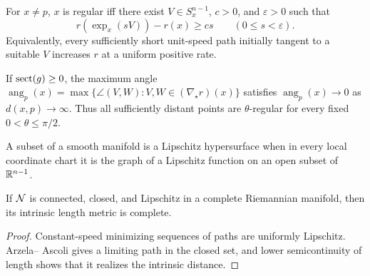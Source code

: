 \begin{lemma}
\label{lem:chow-iii-i34-i35-regular-characterization}
For $x\ne p$, $x$ is regular iff there exist $V\in S_x^{n-1}$, $c>0$, and
$\varepsilon>0$ such that
\[
r(\exp_x(sV))-r(x)\ge cs\qquad(0\le s<\varepsilon).
\]
Equivalently, every sufficiently short unit-speed path initially tangent to a
suitable $V$ increases $r$ at a uniform positive rate.
\end{lemma}

\begin{lemma}
\label{lem:chow-iii-i37-angle-decay}
If $\operatorname{sect}(g)\ge0$, the maximum angle
$\operatorname{ang}_p(x)=\max\{\angle(V,W):V,W\in(\nabla_\star r)(x)\}$
satisfies $\operatorname{ang}_p(x)\to0$ as $d(x,p)\to\infty$.  Thus all
sufficiently distant points are $\theta$-regular for every fixed
$0<\theta\le\pi/2$.
\end{lemma}

\begin{definition}
\label{def:chow-iii-i39-lipschitz-hypersurface}
A subset of a smooth manifold is a Lipschitz hypersurface when in every local
coordinate chart it is the graph of a Lipschitz function on an open subset of
$\mathbb R^{n-1}$.
\end{definition}

\begin{lemma}
\label{lem:chow-iii-i40-lipschitz-complete}
If $\mathcal N$ is connected, closed, and Lipschitz in a complete Riemannian
manifold, then its intrinsic length metric is complete.
\end{lemma}
\begin{proof}
\sketch
Constant-speed minimizing sequences of paths are uniformly Lipschitz.  Arzela--
Ascoli gives a limiting path in the closed set, and lower semicontinuity of
length shows that it realizes the intrinsic distance.
\end{proof}

